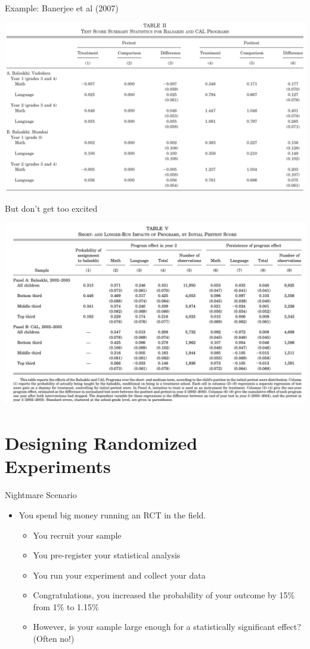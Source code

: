 \documentclass[aspectratio=169,11pt]{beamer}
\begin{document}
\begin{frame}{Example: Banerjee et al (2007)}
\begin{center}
\includegraphics[width=.9\textwidth]{banerjee-t2}
\end{center}
\end{frame}


\begin{frame}{But don't get too excited}
\begin{center}
\includegraphics[width=.9\textwidth]{banerjee-t5}
\end{center}
\end{frame}


\section{Designing Randomized Experiments}


\begin{frame}{Nightmare Scenario}
\begin{itemize}
\item You spend big money running an RCT in the field.
\begin{itemize}
  \item You \alert{recruit} your sample
  \item You \alert{pre-register} your statistical analysis
  \item You run your \alert{experiment} and collect your data
  \item Congratulations, you increased the probability of your outcome by 15\% from 1\% to 1.15\%
  \item However, is your sample large enough for a \alert{statistically significant} effect? (Often no!)
\end{itemize}
\end{itemize}
\end{frame}
\end{document}
